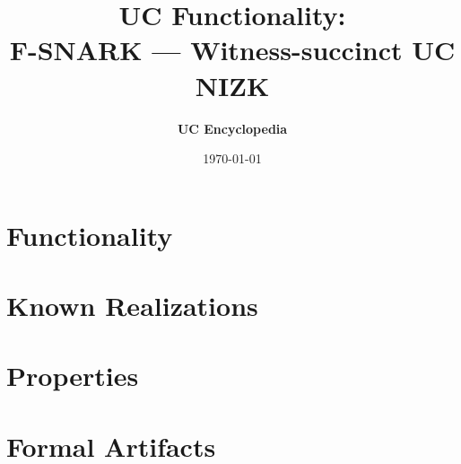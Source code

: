 \documentclass[11pt,a4paper]{article}
\title{\textbf{\Large UC Functionality:}\\[0.2em] \Large F-SNARK --- Witness-succinct UC NIZK}
\author{\textbf{UC Encyclopedia}}
\date{\today}
\newtheorem{functionality}{Functionality}
\begin{document}
\maketitle

\begin{abstract}
\end{abstract}

\section{Functionality}

%

\section{Known Realizations}


\section{Properties}


\section{Formal Artifacts}

\end{document}
